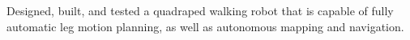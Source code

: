 \documentclass[../Gabriel_Roper_Resume]{subfiles}
\begin{document}


{Designed, built, and tested a quadraped walking robot that
    is capable of fully automatic leg motion planning, as well as autonomous mapping and navigation.}
\end{document}
